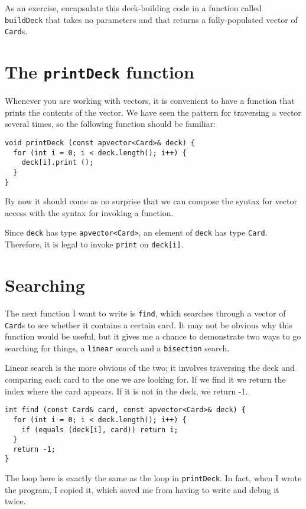 
As an exercise, encapsulate this deck-building code in a function called
{\tt buildDeck} that takes no parameters and that returns a
fully-populated vector of {\tt Card}s.

\section{The {\tt printDeck} function}
\label{printdeck}

Whenever you are working with vectors, it is convenient to have
a function that prints the contents of the vector.  We have
seen the pattern for traversing a vector several times, so the
following function should be familiar:

\begin{verbatim}
void printDeck (const apvector<Card>& deck) {
  for (int i = 0; i < deck.length(); i++) {
    deck[i].print ();
  }
}
\end{verbatim}
%
By now it should come as no surprise that we can compose the
syntax for vector access with the syntax for invoking a function.

Since {\tt deck} has type {\tt apvector<Card>}, an element of {\tt deck}
has type {\tt Card}.  Therefore, it is legal to invoke {\tt print}
on {\tt deck[i]}.

\section{Searching}
\label{find}

The next function I want to write is {\tt find}, which searches
through a vector of {\tt Card}s to see whether it contains a certain
card.  It may not be obvious why this function would be useful, but it
gives me a chance to demonstrate two ways to go searching for things,
a {\tt linear} search and a {\tt bisection} search.


Linear search is the more obvious of the two; it involves traversing
the deck and comparing each card to the one we are looking for.  If we
find it we return the index where the card appears.  If it is not in
the deck, we return -1.

\begin{verbatim}
int find (const Card& card, const apvector<Card>& deck) {
  for (int i = 0; i < deck.length(); i++) {
    if (equals (deck[i], card)) return i;
  }
  return -1;
}
\end{verbatim}
%
The loop here is exactly the same as the loop in {\tt printDeck}.
In fact, when I wrote the program, I copied it, which saved me
from having to write and debug it twice.

